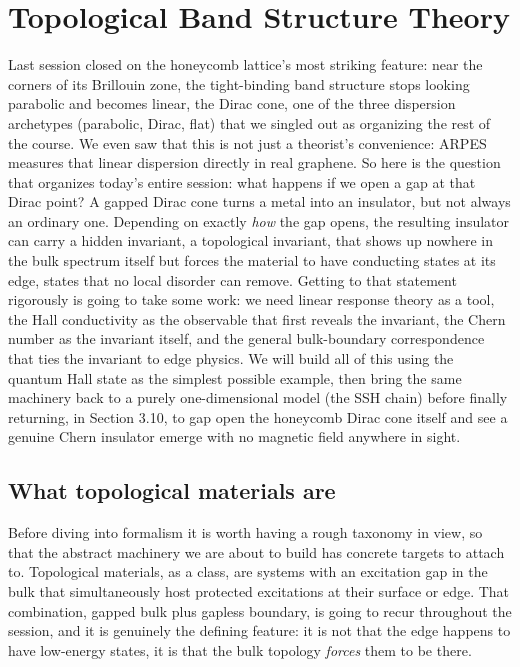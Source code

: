 \chapter{Topological Band Structure Theory}

Last session closed on the honeycomb lattice's most striking feature: near the corners of its
Brillouin zone, the tight-binding band structure stops looking parabolic and becomes linear, the
Dirac cone, one of the three dispersion archetypes (parabolic, Dirac, flat) that we singled out as
organizing the rest of the course. We even saw that this is not just a theorist's convenience: ARPES
measures that linear dispersion directly in real graphene. So here is the question that organizes
today's entire session: what happens if we open a gap at that Dirac point? A gapped Dirac cone turns
a metal into an insulator, but not always an ordinary one. Depending on exactly \emph{how} the gap opens,
the resulting insulator can carry a hidden invariant, a topological invariant, that shows up nowhere
in the bulk spectrum itself but forces the material to have conducting states at its edge, states
that no local disorder can remove. Getting to that statement rigorously is going to take some work:
we need linear response theory as a tool, the Hall conductivity as the observable that first reveals
the invariant, the Chern number as the invariant itself, and the general bulk-boundary correspondence
that ties the invariant to edge physics. We will build all of this using the quantum Hall state as
the simplest possible example, then bring the same machinery back to a purely one-dimensional model
(the SSH chain) before finally returning, in Section 3.10, to gap open the honeycomb Dirac cone
itself and see a genuine Chern insulator emerge with no magnetic field anywhere in sight.

\section{What topological materials are}

Before diving into formalism it is worth having a rough taxonomy in view, so that the abstract
machinery we are about to build has concrete targets to attach to. Topological materials, as a
class, are systems with an excitation gap in the bulk that simultaneously host protected excitations
at their surface or edge. That combination, gapped bulk plus gapless boundary, is going to recur
throughout the session, and it is genuinely the defining feature: it is not that the edge happens to
have low-energy states, it is that the bulk topology \emph{forces} them to be there.

